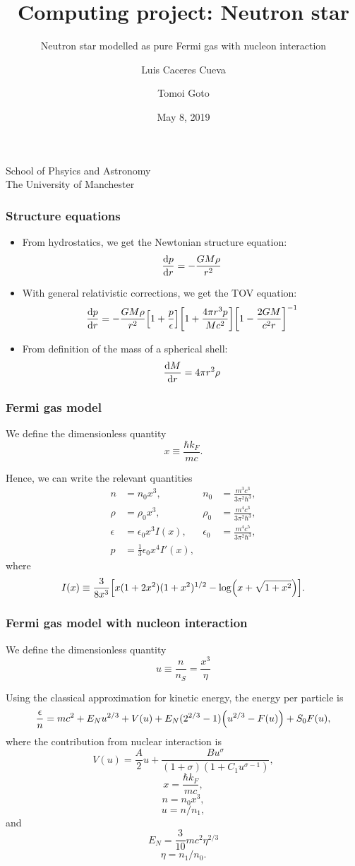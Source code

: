 \documentclass[hperref={pdfpagelabels=false}]{beamer}
\begin{document}
\title
{Computing project: Neutron star}

\subtitle{Neutron star modelled as pure Fermi gas with nucleon interaction}

\author
{Luis Caceres Cueva \and Tomoi Goto}

\institute
{
    School of Phsyics and Astronomy\\
    The University of Manchester
}
\date
{May 8, 2019}

\begin{frame}
 \titlepage
\end{frame}

\begin{frame}
    \frametitle{Structure equations}
    \begin{itemize}
        \item From hydrostatics, we get the Newtonian structure equation: \[\dv{p}{r}=-\frac{GM\rho}{r^{2}}\]
        \item With general relativistic corrections, we get the TOV equation: \[\dv{p}{r}=-\frac{GM\rho}{r^{2}}\qty[1+\frac{p}{\epsilon}]\qty[1+\frac{4\pi r^{3}p}{Mc^{2}}]\qty[1-\frac{2GM}{c^{2}r}]^{-1}\]
        \item From definition of the mass of a spherical shell: \[\dv{M}{r}=4\pi r^{2}\rho\]
    \end{itemize}
\end{frame}


\begin{frame}
 \frametitle{Fermi gas model}
 We define the dimensionless quantity \[x\equiv\frac{\hbar k_{F}}{mc}.\]
 
 Hence, we can write the relevant quantities
 \begin{align*}
  n&=n_{0}x^{3},&n_{0}&=\frac{m^{3}c^{3}}{3\pi^{2}\hbar^{3}},\\
  \rho&=\rho_{0}x^{3},&\rho_{0}&=\frac{m^{4}c^{3}}{3\pi^{2}\hbar^{3}},\\
  \epsilon&=\epsilon_{0}x^{3}I(x),&\epsilon_{0}&=\frac{m^{4}c^{5}}{3\pi^{2}\hbar^{3}},\\
  p&=\frac{1}{3}\epsilon_{0}x^{4}I'(x),
 \end{align*}
 where \[I(x)\equiv \frac{3}{8x^{3}}\qty[x(1+2x^{2})(1+x^{2})^{1/2}-\log(x+\sqrt{1+x^{2}})].\]
\end{frame}


\begin{frame}
 \frametitle{Fermi gas model with nucleon interaction}
 We define the dimensionless quantity \[u\equiv\frac{n}{n_{S}}=\frac{x^{3}}{\eta}\] %
 
 Using the classical approximation for kinetic energy, the energy per particle is
 \[\frac{\epsilon}{n}=mc^{2}+E_{N}u^{2/3}+V(u)+E_{N}(2^{2/3}-1)\qty(u^{2/3}-F(u))+S_{0}F(u),\]
 where the contribution from nuclear interaction is
 \[V(u)=\frac{A}{2}u+\frac{Bu^{\sigma}}{(1+\sigma)(1+C_{1}u^{\sigma-1})},\]
\[x=\frac{\hbar k_{F}}{mc},\]
 \[n=n_{0}x^{3},\]
 \[u=n/n_{1},\]
 and
 \[E_{N}=\frac{3}{10}mc^{2}\eta^{2/3}\]
 \[\eta=n_{1}/n_{0}.\]
\end{frame}
\end{document}
